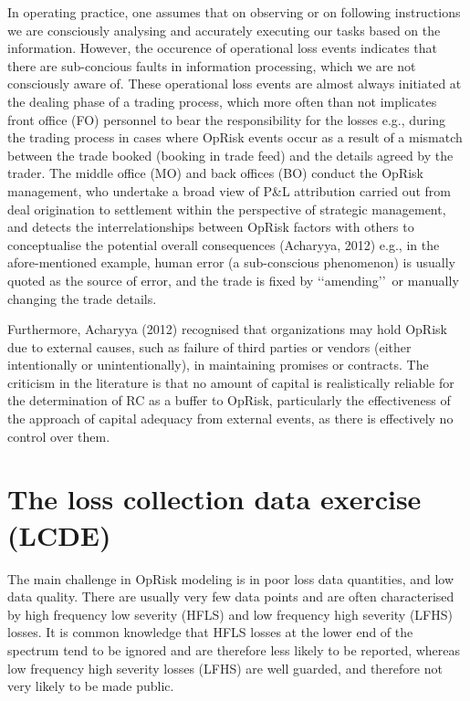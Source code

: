 \documentclass{DissertateUSU}
\begin{document}
In operating practice, one assumes that on observing or on following
instructions we are consciously analysing and accurately executing our
tasks based on the information. However, the occurence of operational
loss events indicates that there are sub-concious faults in information
processing, which we are not consciously aware of. These operational
loss events are almost always initiated at the dealing phase of a
trading process, which more often than not implicates front office (FO)
personnel to bear the responsibility for the losses e.g., during the
trading process in cases where OpRisk events occur as a result of a
mismatch between the trade booked (booking in trade feed) and the
details agreed by the trader. The middle office (MO) and back offices
(BO) conduct the OpRisk management, who undertake a broad view of P\&L
attribution carried out from deal origination to settlement within the
perspective of strategic management, and detects the interrelationships
between OpRisk factors with others to conceptualise the potential
overall consequences (Acharyya, 2012) e.g., in the afore-mentioned
example, human error (a sub-conscious phenomenon) is usually quoted as
the source of error, and the trade is fixed by \lq\lq amending\rq\rq~or
manually changing the trade details. \medskip

Furthermore, Acharyya (2012) recognised that organizations may hold
OpRisk due to external causes, such as failure of third parties or
vendors (either intentionally or unintentionally), in maintaining
promises or contracts. The criticism in the literature is that no amount
of capital is realistically reliable for the determination of RC as a
buffer to OpRisk, particularly the effectiveness of the approach of
capital adequacy from external events, as there is effectively no
control over them.\medskip

\section{The loss collection data exercise (LCDE)}
\label{sec:The loss collection data exercise (LCDE)}

The main challenge in OpRisk modeling is in poor loss data quantities,
and low data quality. There are usually very few data points and are
often characterised by high frequency low severity (HFLS) and low
frequency high severity (LFHS) losses. It is common knowledge that HFLS
losses at the lower end of the spectrum tend to be ignored and are
therefore less likely to be reported, whereas low frequency high
severity losses (LFHS) are well guarded, and therefore not very likely
to be made public.\medskip
\end{document}
